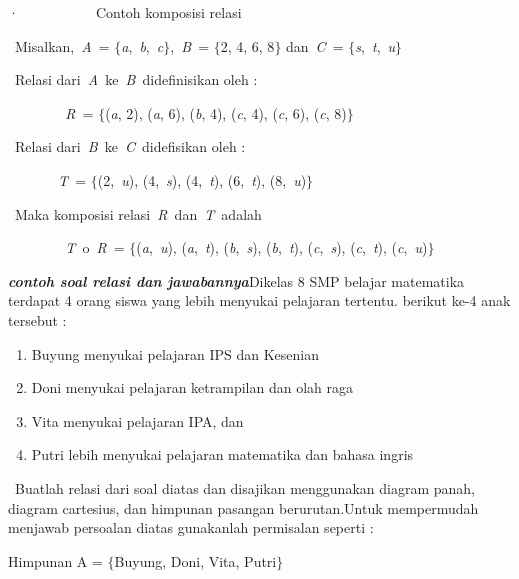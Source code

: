\documentclass[11pt,fleqn]{book} %
\begin{document}
\noindent ·~~~~~~~~~~~Contoh komposisi relasi

\noindent {\O}~Misalkan,~\textit{A~}= $\{$\textit{a},~\textit{b},~\textit{c}$\}$,~\textit{B~}= $\{$2, 4, 6, 8$\}$ dan~\textit{C~}= $\{$\textit{s},~\textit{t},~\textit{u}$\}$

\noindent {\O}~Relasi dari~\textit{A~}ke~\textit{B~}didefinisikan oleh :

\noindent \textit{~~~~~~~~R~}= $\{$(\textit{a}, 2), (\textit{a}, 6), (\textit{b}, 4), (\textit{c}, 4), (\textit{c}, 6), (\textit{c}, 8)$\}$

\noindent {\O}~Relasi dari~\textit{B~}ke~\textit{C~}didefisikan oleh :

\noindent \textit{~~~~~~~T~}= $\{$(2,~\textit{u}), (4,~\textit{s}), (4,~\textit{t}), (6,~\textit{t}), (8,~\textit{u})$\}$

\noindent {\O}~Maka komposisi relasi~\textit{R~}dan~\textit{T~}adalah

\noindent \textit{~~~~~~~~T~}$\mathrm{o}$~\textit{R~}= $\{$(\textit{a},~\textit{u}), (\textit{a},~\textit{t}), (\textit{b},~\textit{s}), (\textit{b},~\textit{t}), (\textit{c},~\textit{s}), (\textit{c},~\textit{t}), (\textit{c},~\textit{u})$\}$

\noindent 

\noindent \textbf{\textit{contoh soal relasi dan jawabannya}}Dikelas 8 SMP belajar matematika terdapat 4 orang siswa yang lebih menyukai pelajaran tertentu. berikut ke-4 anak tersebut :

\begin{enumerate}
\item  Buyung menyukai pelajaran IPS dan Kesenian

\item  Doni menyukai pelajaran ketrampilan dan olah raga

\item  Vita menyukai pelajaran IPA, dan

\item  Putri lebih menyukai pelajaran matematika dan bahasa ingris
\end{enumerate}

\noindent ~Buatlah relasi dari soal diatas dan disajikan menggunakan diagram panah, diagram cartesius, dan himpunan pasangan berurutan.\textit{}Untuk mempermudah menjawab persoalan diatas gunakanlah permisalan seperti :

\noindent 

\noindent Himpunan A = $\{$Buyung, Doni, Vita, Putri$\}$
\end{document}
